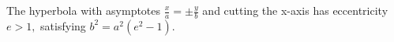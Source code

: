The hyperbola with asymptotes $  \frac{x}{a} = \pm \frac{y}{b} $
and cutting the x-axis
has eccentricity $ e > 1 , $ satisfying $ b^2 = a^2 (e^2 -1 ) . $